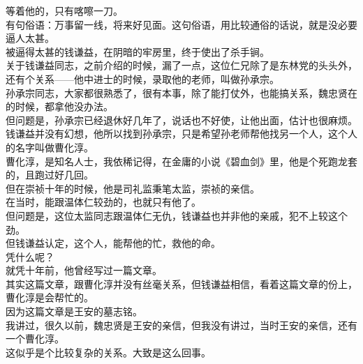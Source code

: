 \begin{multicols}{\theparacolNo}
等着他的，只有喀嚓一刀。\\

有句俗语：万事留一线，将来好见面。这句俗语，用比较通俗的话说，就是没必要逼人太甚。\\

被逼得太甚的钱谦益，在阴暗的牢房里，终于使出了杀手锏。\\

关于钱谦益同志，之前介绍的时候，漏了一点，这位仁兄除了是东林党的头头外，还有个关系——他中进士的时候，录取他的老师，叫做孙承宗。\\

孙承宗同志，大家都很熟悉了，很有本事，除了能打仗外，也能搞关系，魏忠贤在的时候，都拿他没办法。\\

但问题是，孙承宗已经退休好几年了，说话也不好使，让他出面，估计也很麻烦。\\

钱谦益并没有幻想，他所以找到孙承宗，只是希望孙老师帮他找另一个人，这个人的名字叫做曹化淳。\\

曹化淳，是知名人士，我依稀记得，在金庸的小说《碧血剑》里，他是个死跑龙套的，且跑过好几回。\\

但在崇祯十年的时候，他是司礼监秉笔太监，崇祯的亲信。\\

在当时，能跟温体仁较劲的，也就只有他了。\\

但问题是，这位太监同志跟温体仁无仇，钱谦益也并非他的亲戚，犯不上较这个劲。\\

但钱谦益认定，这个人，能帮他的忙，救他的命。\\

凭什么呢？\\

就凭十年前，他曾经写过一篇文章。\\

其实这篇文章，跟曹化淳并没有丝毫关系，但钱谦益相信，看着这篇文章的份上，曹化淳是会帮忙的。\\

因为这篇文章是王安的墓志铭。\\

我讲过，很久以前，魏忠贤是王安的亲信，但我没有讲过，当时王安的亲信，还有一个曹化淳。\\

这似乎是个比较复杂的关系。大致是这么回事。\\


\end{multicols}
